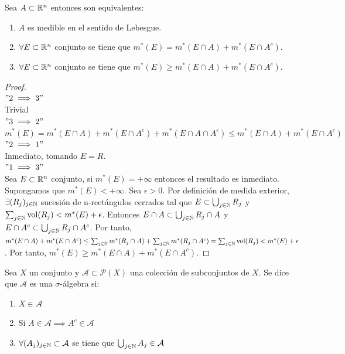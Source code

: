 \begin{proposición}
Sea $A \subset \mathbb{R}^n$ entonces son equivalentes:
\vspace{-0.5em}
\begin{enumerate}
    \item $A$ es medible en el sentido de Lebesgue.
    \item $\forall E \subset \mathbb{R}^n$ conjunto se tiene que $m^*(E) = m^*(E \cap A) + m^*(E \cap A^c)$.
    \item $\forall E \subset \mathbb{R}^n$ conjunto se tiene que $m^*(E) \geq m^*(E \cap A) + m^*(E \cap A^c)$.
\end{enumerate}
\end{proposición}

\begin{proof}
    \leavevmode\\
    $"2 \implies 3"$\\
    Trivial\\
    $"3 \implies 2"$\\
    $m^*(E) = m^*(E \cap A) + m^*(E \cap A^c) + m^*(E \cap A \cap A^c) \leq m^*(E \cap A) + m^*(E \cap A^c)$\\
    $"2 \implies 1"$\\
    Inmediato, tomando $E = R$.\\
    $"1 \implies 3"$\\
    Sea $E \subset \mathbb{R}^n$ conjunto, si $m^*(E) = +\infty$ entonces el resultado es inmediato. Supongamos que $m^*(E) < +\infty$. Sea $\epsilon > 0$. Por definición de medida exterior, $\exists (R_j)_{j \in \mathbb{N}}$ sucesión de n-rectángulos cerrados tal que $E \subset \bigcup_{j \in \mathbb{N}} R_j$ y $\sum_{j \in \mathbb{N}} \text{vol}(R_j) < m^*(E) + \epsilon$. Entonces $E \cap A \subset \bigcup_{j \in \mathbb{N}} R_j \cap A$ y $E \cap A^c \subset \bigcup_{j \in \mathbb{N}} R_j \cap A^c$. Por tanto, $m^*(E \cap A) + m^*(E \cap A^c) \leq \sum_{j \in \mathbb{N}} m^*(R_j \cap A) + \sum_{j \in \mathbb{N}} m^*(R_j \cap A^c) = \sum_{j \in \mathbb{N}} \text{vol}(R_j) < m^*(E) + \epsilon$. Por tanto, $m^*(E) \geq m^*(E \cap A) + m^*(E \cap A^c)$.
\end{proof}

\begin{definición}
Sea $X$ un conjunto y $\mathcal{A} \subset \mathcal{P}(X)$ una colección de subconjuntos de $X$. Se dice que $\mathcal{A}$ es una $\sigma$-álgebra si:
\vspace{-0.5em}
\begin{enumerate}
    \item $X \in \mathcal{A}$
    \item Si $A \in \mathcal{A} \implies A^c \in \mathcal{A}$
    \item $\forall (A_j)_{j \in \mathbb{N}} \subset \mathcal{A}$ se tiene que $\bigcup_{j \in \mathbb{N}} A_j \in \mathcal{A}$
\end{enumerate}
\end{definición}

